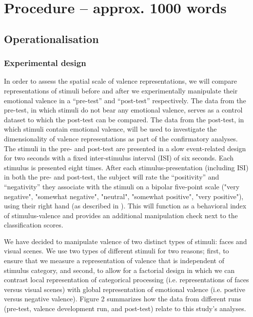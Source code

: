 \documentclass[12pt,a4paper]{article}\usepackage[]{graphicx}\usepackage[]{color}
\begin{document}
\noindent
\wordcount 

\section{Procedure \textmd{– approx. 1000 words}}
\subsection{Operationalisation}
\subsubsection{Experimental design}
In order to assess the spatial scale of valence representations, we will compare representations of stimuli before and after we experimentally manipulate their emotional valence in a ``pre-test'' and ``post-test'' respectively. The data from the pre-test, in which stimuli do not bear any emotional valence, serves as a control dataset to which the post-test can be compared. The data from the post-test, in which stimuli contain emotional valence, will be used to investigate the dimensionality of valence representations as part of the confirmatory analyses. The stimuli in the pre- and post-test are presented in a slow event-related design for two seconds with a fixed inter-stimulus interval (ISI) of six seconds. Each stimulus is presented eight times. After each stimulus-presentation (including ISI) in both the pre- and post-test, the subject will rate the ``positivity'' and ``negativity'' they associate with the stimuli on a bipolar five-point scale ("very negative", "somewhat negative", "neutral", "somewhat positive", "very positive"), using their right hand (as described in \citealp{diaz2013}). This will function as a behavioral index of stimulus-valence and provides an additional manipulation check next to the classification scores.   

We have decided to manipulate valence of two distinct types of stimuli: faces and visual scenes. We use two types of different stimuli for two reasons; first, to ensure that we measure a representation of valence that is independent of stimulus category, and second, to allow for a factorial design in which we can contrast local representation of categorical processing (i.e. representations of faces versus visual scenes) with global representation of emotional valence (i.e. postive versus negative valence). Figure 2 summarizes how the data from different runs (pre-test, valence development run, and post-test) relate to this study's analyses.
\end{document}
